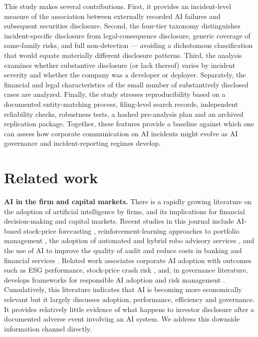 \documentclass[utf8]{FrontiersinHarvard}
\begin{document}
This study makes several contributions. First, it provides an incident-level measure of the association between externally recorded AI failures and subsequent securities disclosure. Second, the four-tier taxonomy distinguishes incident-specific disclosure from legal-consequence disclosure, generic coverage of same-family risks, and full non-detection --- avoiding a dichotomous classification that would equate materially different disclosure patterns. Third, the analysis examines whether substantive disclosure (or lack thereof) varies by incident severity and whether the company was a developer or deployer. Separately, the financial and legal characteristics of the small number of substantively disclosed cases are analyzed. Finally, the study stresses reproducibility based on a documented entity-matching process, filing-level search records, independent reliability checks, robustness tests, a hashed pre-analysis plan and an archived replication package. Together, these features provide a baseline against which one can assess how corporate communication on AI incidents might evolve as AI governance and incident-reporting regimes develop.

\section{Related work}

\textbf{AI in the firm and capital markets.} There is a rapidly growing literature on the adoption of artificial intelligence by firms, and its implications for financial decision-making and capital markets. Recent studies in this journal include AI-based stock-price forecasting \citep{Rohan2026}, reinforcement-learning approaches to portfolio management \citep{YangPortfolio2026}, the adoption of automated and hybrid robo advisory services \citep{Verma2026}, and the use of AI to improve the quality of audit and reduce costs in banking and financial services \citep{Johri2026}. Related work associates corporate AI adoption with outcomes such as ESG performance, stock-price crash risk \citep{Shen2025,YangCrash2026}, and, in governance literature, develops frameworks for responsible AI adoption and risk management \citep{Madanchian2025}. Cumulatively, this literature indicates that AI is becoming more economically relevant but it largely discusses adoption, performance, efficiency and governance. It provides relatively little evidence of what happens to investor disclosure after a documented adverse event involving an AI system. We address this downside information channel directly.
\end{document}
